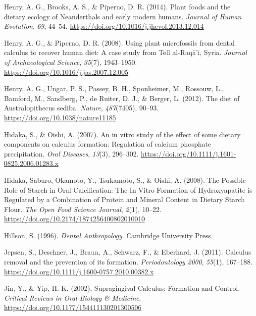 \documentclass[
  b5paper,
]{book}
\newlength{\cslhangindent}
\newenvironment{CSLReferences}[2] %
 {\begin{list}{}{%
  \setlength{\itemindent}{0pt}
  \setlength{\leftmargin}{0pt}
  \setlength{\parsep}{0pt}
  \ifodd #1
   \setlength{\leftmargin}{\cslhangindent}
   \setlength{\itemindent}{-1\cslhangindent}
  \fi
  \setlength{\itemsep}{#2\baselineskip}}}
 {\end{list}}
\begin{document}
\begin{CSLReferences}{1}{0}
Henry, A. G., Brooks, A. S., \& Piperno, D. R. (2014). Plant foods and
the dietary ecology of {Neanderthals} and early modern humans.
\emph{Journal of Human Evolution}, \emph{69}, 44--54.
\url{https://doi.org/10.1016/j.jhevol.2013.12.014}

Henry, A. G., \& Piperno, D. R. (2008). Using plant microfossils from
dental calculus to recover human diet: A case study from {Tell}
al-{Raqā}'i, {Syria}. \emph{Journal of Archaeological Science},
\emph{35}(7), 1943--1950.
\url{https://doi.org/10.1016/j.jas.2007.12.005}

Henry, A. G., Ungar, P. S., Passey, B. H., Sponheimer, M., Rossouw, L.,
Bamford, M., Sandberg, P., de Ruiter, D. J., \& Berger, L. (2012). The
diet of {Australopithecus} sediba. \emph{Nature}, \emph{487}(7405),
90--93. \url{https://doi.org/10.1038/nature11185}

Hidaka, S., \& Oishi, A. (2007). An in vitro study of the effect of some
dietary components on calculus formation: Regulation of calcium
phosphate precipitation. \emph{Oral Diseases}, \emph{13}(3), 296--302.
\url{https://doi.org/10.1111/j.1601-0825.2006.01283.x}

Hidaka, Saburo, Okamoto, Y., Tsukamoto, S., \& Oishi, A. (2008). The
{Possible Role} of {Starch} in {Oral Calcification}: {The In Vitro
Formation} of {Hydroxyapatite} is {Regulated} by a {Combination} of
{Protein} and {Mineral Content} in {Dietary Starch Flour}. \emph{The
Open Food Science Journal}, \emph{2}(1), 10--22.
\url{https://doi.org/10.2174/1874256400802010010}

Hillson, S. (1996). \emph{Dental {Anthropology}}. {Cambridge University
Press}.

Jepsen, S., Deschner, J., Braun, A., Schwarz, F., \& Eberhard, J.
(2011). Calculus removal and the prevention of its formation.
\emph{Periodontology 2000}, \emph{55}(1), 167--188.
\url{https://doi.org/10.1111/j.1600-0757.2010.00382.x}

Jin, Y., \& Yip, H.-K. (2002). Supragingival {Calculus}: {Formation} and
{Control}. \emph{Critical Reviews in Oral Biology \& Medicine}.
\url{https://doi.org/10.1177/154411130201300506}


\end{CSLReferences}
\end{document}
